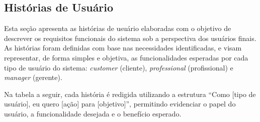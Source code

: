 \subsection{Histórias de Usuário}

Esta seção apresenta as histórias de usuário elaboradas com o objetivo de descrever os requisitos funcionais do sistema sob a perspectiva dos usuários finais. As histórias foram definidas com base nas necessidades identificadas, e visam representar, de forma simples e objetiva, as funcionalidades esperadas por cada tipo de usuário do sistema: \textit{customer} (cliente), \textit{professional} (profissional) e \textit{manager} (gerente). 

Na tabela a seguir, cada história é redigida utilizando a estrutura “Como [tipo de usuário], eu quero [ação] para [objetivo]”, permitindo evidenciar o papel do usuário, a funcionalidade desejada e o benefício esperado.


